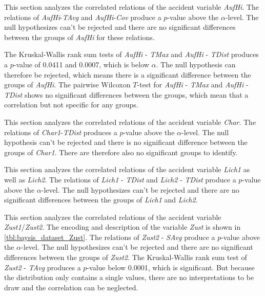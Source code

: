 This section analyzes the correlated relations of the accident variable \textit{AufHi}. The relations of \textit{AufHi}-\textit{TAvg} and \textit{AufHi}-\textit{Cov} produce a $p$-value above the $\alpha$-level. The null hypothesizes can't be rejected and there are no significant differences between the groups of \textit{AufHi} for these relations.

The Kruskal-Wallis rank sum tests of \textit{AufHi} - \textit{TMax} and \textit{AufHi} - \textit{TDist} produces a $p$-value of 0.0411 and 0.0007, which is below $\alpha$. The null hypothesis can therefore be rejected, which means there is a significant difference between the groups of \textit{AufHi}. The pairwise Wilcoxon $T$-test for \textit{AufHi} - \textit{TMax} and \textit{AufHi} - \textit{TDist} shows no significant differences between the groups, which mean that a correlation but not specific for any groups. 

This section analyzes the correlated relations of the accident variable \textit{Char}. The relations of \textit{Char1}-\textit{TDist} produces a $p$-value above the $\alpha$-level. The null hypothesis can't be rejected and there is no significant difference between the groups of \textit{Char1}. There are therefore also no significant groups to identify.

This section analyzes the correlated relations of the accident variable \textit{Lich1} as well as \textit{Lich2}. The relations of \textit{Lich1} - \textit{TDist} and \textit{Lich2} - \textit{TDist} produce a $p$-value above the $\alpha$-level. The null hypothesizes can't be rejected and there are no significant differences between the groups of \textit{Lich1} and \textit{Lich2}.

This section analyzes the correlated relations of the accident variable \textit{Zust1}/\textit{Zust2}. The encoding and description of the variable \textit{Zust} is shown in \cref{tbl:baysis_dataset_Zust}. The relations of \textit{Zust2} - \textit{SAvg} produce a $p$-value above the $\alpha$-level. The null hypothesizes can't be rejected and there are no significant differences between the groups of \textit{Zust2}. The Kruskal-Wallis rank sum test of \textit{Zust2} - \textit{TAvg} produces a $p$-value below 0.0001, which is significant. But because the distribution only contains a single values, there are no interpretations to be draw and the correlation can be neglected.

